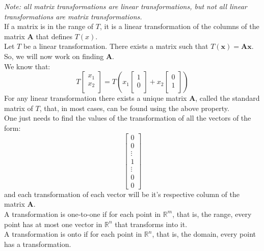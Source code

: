 \documentclass[nobib]{tufte-handout}
\begin{document}
\textit{Note: all matrix transformations are linear transformations, but not all linear transformations are matrix transformations.}\\
If a matrix is in the range of $T$, it is a linear transformation of the columns of the matrix \textbf{A} that defines $T(x)$.\\
Let $T$ be a linear transformation. There exists a matrix such that $T(\mathbf{x})=\mathbf{Ax}$. So, we will now work on finding \textbf{A}.\\
We know that:
\begin{equation*}
    T
    \begin{bmatrix}
        x_1 \\ x_2 \\
    \end{bmatrix} = T\left(x_1
    \begin{bmatrix}
        1 \\ 0 \\
    \end{bmatrix}+x_2
    \begin{bmatrix}
        0 \\ 1 \\
    \end{bmatrix}\right)
\end{equation*}
For any linear transformation there exists a unique matrix \textbf{A}, called the standard matrix of $T$, that, in most cases, can be found using the above property.\\
One just needs to find the values of the transformation of all the vectors of the form:
\begin{equation*}
    \begin{bmatrix}
        0 \\ 0 \\ \vdots \\ 1 \\ \vdots \\0\\0
    \end{bmatrix}
\end{equation*}
and each transformation of each vector will be it's respective column of the matrix \textbf{A}.\\
A transformation is one-to-one if for each point in $\mathbb{R}^m$, that is, the range, every point has at most one vector in $\mathbb{R}^n$ that transforms into it.\\
A transformation is onto if for each point in $\mathbb{R}^n$, that is, the domain, every point has a transformation.\\
\end{document}
